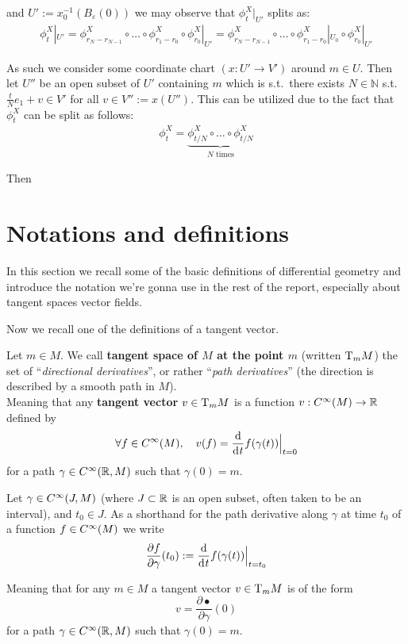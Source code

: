		and $U' := x_0^{-1}(B_\varepsilon(0))$ we may observe that $\phi_t^X|_{U'}$ splits as:
		\begin{align*}
			\phi_t^X|_{U'} = \phi_{r_N - r_{N - 1}}^X \circ \ldots \circ \phi_{r_1 - r_0}^X \circ \phi_{r_0}^X|_{U'} = \phi_{r_N - r_{N - 1}}^X \circ \ldots \circ \phi_{r_1 - r_0}^X|_{U_0} \circ \phi_{r_0}^X|_{U'}
		\end{align*}

		As such we consider some coordinate chart $(x : U' \to V')$ around $m \in U$. Then let $U''$ be an open subset of $U'$ containing $m$ which is s.t.\ there exists $N \in \mathbb{N}$ s.t.\ $\frac{t}{N}e_1 + v \in V'$ for all $v \in V'' := x(U'')$. This can be utilized due to the fact that $\phi_t^X$ can be split as follows: 
		\begin{align*}
			\phi_t^X = \underbrace{\phi_{t/N}^X \circ \ldots \circ \phi_{t/N}^X}_{\text{$N$ times}}
		\end{align*}

		Then

\newpage

\section{Notations and definitions}

	In this section we recall some of the basic definitions of differential geometry and introduce the notation we're gonna use in the rest of the report, especially about tangent spaces vector fields.


	Now we recall one of the definitions of a tangent vector.

	\begin{definition}
		Let $m \in M$.
		We call \textbf{tangent space of $M$ at the point $m$} (written $\mathrm{T}_m{M}$) the set of ``\emph{directional derivatives}'', or rather ``\emph{path derivatives}'' (the direction is described by a smooth path in $M$). \\
		Meaning that any \textbf{tangent vector} $v \in \mathrm{T}_m{M}$ is a function $v: C^\infty(M) \to \mathbb{R}$ defined by
		$$
			\forall f \in \Cinf(M), \quad v(f) = \frac{\d}{\di{t}} f(\gamma(t)) \Big|_{t=0}
		$$
		for a path $\gamma \in C^\infty(\mathbb{R}, M)$ such that $\gamma(0) = m$.
	\end{definition}

	\begin{notation}
		Let $\gamma \in C^\infty(J, M)$ (where $J \subset \mathbb{R}$ is an open subset, often taken to be an interval), and $t_0 \in J$.
		As a shorthand for the path derivative along $\gamma$ at time $t_0$ of a function $f \in C^\infty(M)$ we write 
		$$
			\frac{\partial f}{\partial \gamma}(t_0) := \frac{\d}{\di{t}} f(\gamma(t)) \Big|_{t=t_0}
		$$

		Meaning that for any $m \in M$ a tangent vector $v \in \mathrm{T}_m{M}$ is of the form
		$$
			v = \frac{\partial \bullet}{\partial \gamma}(0)
		$$
		for a path $\gamma \in C^\infty(\mathbb{R}, M)$ such that $\gamma(0) = m$.
	\end{notation}

